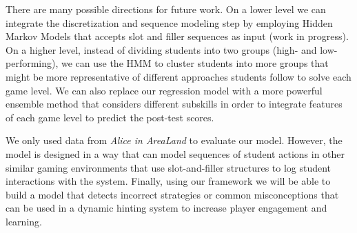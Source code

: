 \documentclass{sigchi}
\begin{document}
There are many possible directions for future work. On a lower level we can integrate the discretization and sequence modeling step by employing Hidden Markov Models that accepts slot and filler sequences as input (work in progress). On a higher level, instead of dividing students into two groups (high- and low-performing), we can use the HMM to cluster students \cite{bicego2003similarity,smyth1997clustering} into more groups that might be  more representative of different approaches students follow to solve each game level. We can also replace our regression model with a more powerful ensemble method that considers different subskills in order to integrate features of each game level to predict the post-test scores.

We only used data from \textit{Alice in AreaLand} to evaluate our model. However, the model is designed in a way that can model sequences of student actions in other similar gaming environments that use slot-and-filler structures to log student interactions with the system. Finally, using our framework we will be able to build a model that detects incorrect strategies or common misconceptions that can be used in a dynamic hinting system to increase player engagement and learning.



\end{document}
